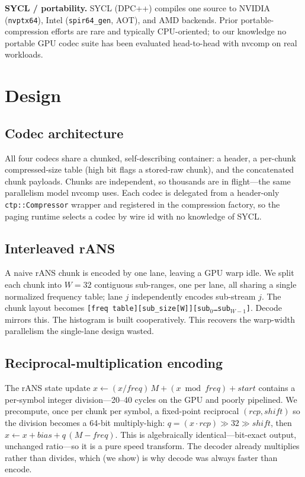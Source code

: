 \documentclass[sigconf,review,anonymous]{acmart}
\begin{document}
\textbf{SYCL / portability.} SYCL (DPC++) compiles one source to NVIDIA
(\texttt{nvptx64}), Intel (\texttt{spir64\_gen}, AOT), and AMD backends. Prior
portable-compression efforts are rare and typically CPU-oriented; to our
knowledge no portable GPU codec suite has been evaluated head-to-head with
nvcomp on real workloads.

\section{Design}
\subsection{Codec architecture}
All four codecs share a chunked, self-describing container: a header, a per-chunk
compressed-size table (high bit flags a stored-raw chunk), and the concatenated
chunk payloads. Chunks are independent, so thousands are in flight---the same
parallelism model nvcomp uses. Each codec is delegated from a header-only
\texttt{ctp::Compressor} wrapper and registered in the compression factory, so
the paging runtime selects a codec by wire id with no knowledge of SYCL.

\subsection{Interleaved rANS}
A naive rANS chunk is encoded by one lane, leaving a GPU warp idle. We split each
chunk into $W{=}32$ contiguous sub-ranges, one per lane, all sharing a single
normalized frequency table; lane $j$ independently encodes sub-stream $j$. The
chunk layout becomes \texttt{[freq table][sub\_size[W]][sub$_0$\dots sub$_{W-1}$]}.
Decode mirrors this. The histogram is built cooperatively. This recovers the
warp-width parallelism the single-lane design wasted.

\subsection{Reciprocal-multiplication encoding}
The rANS state update $x \leftarrow (x/\mathit{freq})\,M + (x \bmod \mathit{freq})
+ \mathit{start}$ contains a per-symbol integer division---20--40 cycles on the
GPU and poorly pipelined. We precompute, once per chunk per symbol, a fixed-point
reciprocal $(\mathit{rcp},\mathit{shift})$ so the division becomes a 64-bit
multiply-high: $q = (x \cdot \mathit{rcp}) \gg 32 \gg \mathit{shift}$, then
$x \leftarrow x + \mathit{bias} + q\,(M-\mathit{freq})$. This is algebraically
identical---bit-exact output, unchanged ratio---so it is a pure speed transform.
The decoder already multiplies rather than divides, which (we show) is why decode
was always faster than encode.
\end{document}
